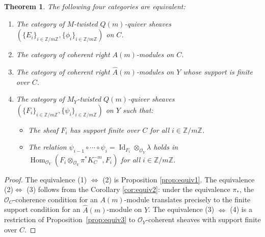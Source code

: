 \documentclass[11pt]{amsart}
\theoremstyle{plain}
\newtheorem{theorem}{Theorem}[section]
\theoremstyle{definition}
\theoremstyle{remark}
\def\O{\mathcal{O}}
\def\zm{\mathbb{Z}/m\mathbb{Z}}
\def\wAm{\widehat{A}(m)}
\begin{document}
\begin{theorem}\label{thm:equiv4}
The following four categories are equivalent:
\begin{enumerate}
    \item The category of $M$-twisted $Q(m)$-quiver sheaves $(\{E_i\}_{i\in\zm}, \{\phi_i\}_{i\in\zm})$ on $C$.
    
    \item The category of coherent right $A(m)$-modules on $C$.
    
    \item The category of coherent right $\wAm$-modules on $Y$ whose support is finite over $C$.
    
    \item The category of $M_Y$-twisted $Q(m)$-quiver sheaves $(\{F_i\}_{i\in\zm}, \{\psi_i\}_{i\in\zm})$ on $Y$ such that:
    \begin{itemize}
        \item[(a)] The sheaf $F_i$ has support finite over $C$ for all $i\in \zm$. 
        \item[(b)] The relation $\psi_{i-1}\circ \cdots \circ \psi_i = \operatorname{Id}_{F_i}\otimes_{\O_Y} \lambda  $ holds in $\operatorname{Hom}_{\O_Y}(F_i\otimes_{\O_Y} \pi^*K_C^{-m}, F_i )$ for all $i\in \mathbb{Z}/m\mathbb{Z}$.
    \end{itemize}
\end{enumerate}
\end{theorem}

\begin{proof}
The equivalence (1) $\Leftrightarrow$ (2) is Proposition \ref{prop:equiv1}. The equivalence (2)$ \Leftrightarrow$ (3) follows from the Corollary \ref{cor:equiv2}: under the equivalence $\pi_*$, the $\mathcal{O}_C$-coherence condition for an $A(m)$-module translates precisely to the finite support condition for an $\wAm$-module on $Y$. The equivalence (3) $\Leftrightarrow$ (4) is a restriction of Proposition~\ref{prop:equiv3} to $\mathcal{O}_Y$-coherent sheaves with support finite over $C$.
\end{proof}
\end{document}
